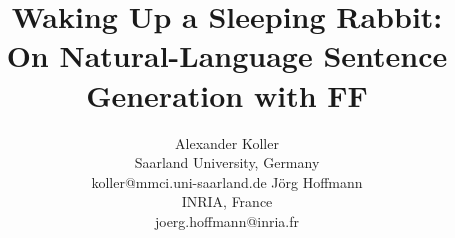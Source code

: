 \documentclass[letterpaper]{article}
\begin{document}
\title{Waking Up a Sleeping Rabbit:\\ On Natural-Language Sentence Generation with FF}

\author{
Alexander Koller \\ Saarland University, Germany \\ koller@mmci.uni-saarland.de
\And
J\"org Hoffmann \\ INRIA, France \\ joerg.hoffmann@inria.fr
}

\nocopyright

\maketitle










{\small


}
\end{document}

